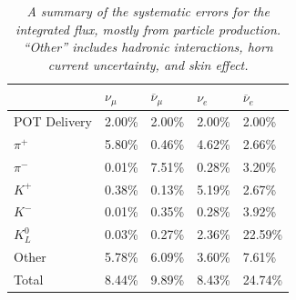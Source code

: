 \begin{table}
\centering
\begin{tabular}{ |p{3 cm}|p{1.2 cm}|p{1.2 cm}|p{1.2 cm}|p{1.2 cm}|   }

 \hline
  & $\nu_\mu$ & $\overline{\nu}_\mu$ & $\nu_e$ & $\overline{\nu}_e$ \\
 \hline 
 POT Delivery & 2.00\% & 2.00\% & 2.00\% & 2.00\% \\
 $\pi^+$ & 5.80\% & 0.46\% & 4.62\% & 2.66\% \\
 $\pi^-$ & 0.01\% & 7.51\% & 0.28\% & 3.20\% \\
 $K^+$ & 0.38\% & 0.13\% & 5.19\% & 2.67\% \\
 $K^-$ & 0.01\% & 0.35\% & 0.28\% & 3.92\% \\
 $K^0_L$ & 0.03\% & 0.27\% & 2.36\% & 22.59\% \\
 Other & 5.78\% & 6.09\% & 3.60\% & 7.61\% \\\hline
 Total & 8.44\% & 9.89\% & 8.43\% & 24.74\% \\\hline
 \hline
\end{tabular}
\caption{\textit{A summary of the systematic errors for the integrated flux, mostly from particle production. ``Other'' includes hadronic interactions, horn current uncertainty, and skin effect.}}\label{UB_flux_sys_table}
\end{table}
